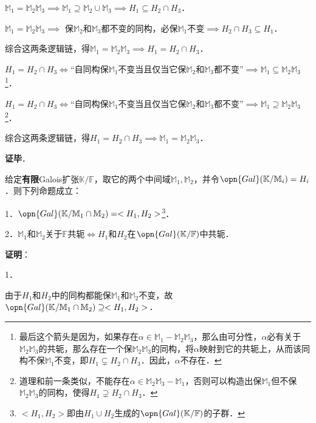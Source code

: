 $\mathbb{M}_1=\mathbb{M}_2\mathbb{M}_3\implies \mathbb{M}_1\supseteq\mathbb{M}_2\cup\mathbb{M}_3\implies H_1\subseteq H_2\cap H_3$．

$\mathbb{M}_1=\mathbb{M}_2\mathbb{M}_3\implies$ 保$\mathbb{M}_2$和$\mathbb{M}_3$都不变的同构，必保$\mathbb{M}_1$不变$\implies H_2\cap H_3\subseteq H_1$．

综合这两条逻辑链，得$\mathbb{M}_1=\mathbb{M}_2\mathbb{M}_3 \implies H_1=H_2\cap H_3$．

$H_1=H_2\cap H_3\iff$“自同构保$\mathbb{M}_1$不变当且仅当它保$\mathbb{M}_2$和$\mathbb{M}_3$都不变”$\implies \mathbb{M}_1\subseteq\mathbb{M}_2\mathbb{M}_3$\footnote{最后这个箭头是因为，如果存在$\alpha\in\mathbb{M}_1-\mathbb{M}_2\mathbb{M}_3$，那么由可分性，$\alpha$必有关于$\mathbb{M}_2\mathbb{M}_3$的共轭，那么存在一个保$\mathbb{M}_2\mathbb{M}_3$的同构，将$\alpha$映射到它的共轭上，从而该同构不保$\mathbb{M}_1$不变，即$H_1\subsetneq H_2\cap H_3$．因此，$\alpha$不存在．}．

$H_1=H_2\cap H_3\iff$“自同构保$\mathbb{M}_1$不变当且仅当它保$\mathbb{M}_2$和$\mathbb{M}_3$都不变”$\implies \mathbb{M}_1\supseteq\mathbb{M}_2\mathbb{M}_3$\footnote{道理和前一条类似，不能存在$\alpha\in\mathbb{M}_2\mathbb{M}_3-\mathbb{M}_1$，否则可以构造出保$\mathbb{M}_1$但不保$\mathbb{M}_2\mathbb{M}_3$的同构，使得$H_1\supsetneq H_2\cap H_3$．}．

综合这两条逻辑链，得$H_1=H_2\cap H_3 \implies \mathbb{M}_1=\mathbb{M}_2\mathbb{M}_3$．


\textbf{证毕}．









\begin{theorem}{}
给定\textbf{有限}Galois扩张$\mathbb{K}/\mathbb{F}$，取它的两个中间域$\mathbb{M}_1, \mathbb{M}_2$，并令$\opn{Gal}(\mathbb{K}/\mathbb{M}_i)=H_i$．则下列命题成立：

1．$\opn{Gal}(\mathbb{K}/\mathbb{M}_1\cap\mathbb{M}_2)=<H_1, H_2>$\footnote{$<H_1, H_2>$即由$H_1\cup H_2$生成的$\opn{Gal}(\mathbb{K}/\mathbb{F})$的子群．}．

2．$\mathbb{M}_1$和$\mathbb{M}_2$关于$\mathbb{F}$共轭$\iff H_1$和$H_2$在$\opn{Gal}(\mathbb{K}/\mathbb{F})$中共轭．

\end{theorem}

\textbf{证明}：

1．

由于$H_1$和$H_2$中的同构都能保$\mathbb{M}_1$和$\mathbb{M}_2$不变，故$\opn{Gal}(\mathbb{K}/\mathbb{M}_1\cap\mathbb{M}_2)\supseteq<H_1, H_2>$．


